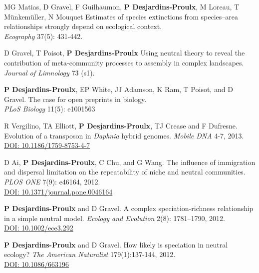 \documentclass[10pt]{article}
\begin{document}
\begin{bibenum}
  \item MG Matias, D Gravel, F Guilhaumon, \textbf{P Desjardins‐Proulx}, M Loreau, T Münkemüller, N Mouquet
    Estimates of species extinctions from species–area relationships strongly depend on ecological context.\\
    \emph{Ecography} 37(5): 431-442.

  \item D Gravel, T Poisot, \textbf{P Desjardins-Proulx}
    Using neutral theory to reveal the contribution of meta-community processes to assembly in complex landscapes.\\
    \emph{Journal of Limnology} 73 (s1).

  \item \textbf{P Desjardins-Proulx}, EP White, JJ Adamson, K Ram, T Poisot, and
    D Gravel. The case for open preprints in biology.\\ \emph{PLoS Biology} 11(5): e1001563

  \item R Vergilino, TA Elliott, \textbf{P Desjardins-Proulx}, TJ Crease and F
Dufresne.  Evolution of a transposon in \emph{Daphnia} hybrid genomes.
\emph{Mobile DNA} 4-7, 2013.\\
\href{http://dx.doi.org/10.1186/1759-8753-4-7}{DOI: 10.1186/1759-8753-4-7}

  \item D Ai, \textbf{P Desjardins-Proulx}, C Chu, and G Wang. The influence of
immigration and dispersal limitation on the repeatability of niche and neutral
communities. \emph{PLOS ONE} 7(9): e46164, 2012.\\
\href{http://dx.doi.org/10.1371/journal.pone.0046164}{DOI: 10.1371/journal.pone.0046164}

  \item \textbf{P Desjardins-Proulx} and D Gravel. A complex speciation-richness
relationship in a simple neutral model. \emph{Ecology and Evolution} 2(8):
1781--1790, 2012.\\
\href{http://dx.doi.org/10.1002/ece3.292}{DOI: 10.1002/ece3.292}

  \item \textbf{P Desjardins-Proulx} and D Gravel. How likely is speciation in
neutral ecology? \emph{The American Naturalist} 179(1):137-144, 2012.\\
\href{http://dx.doi.org/10.1086/663196}{DOI: 10.1086/663196}\\

\end{bibenum}
\end{document}
